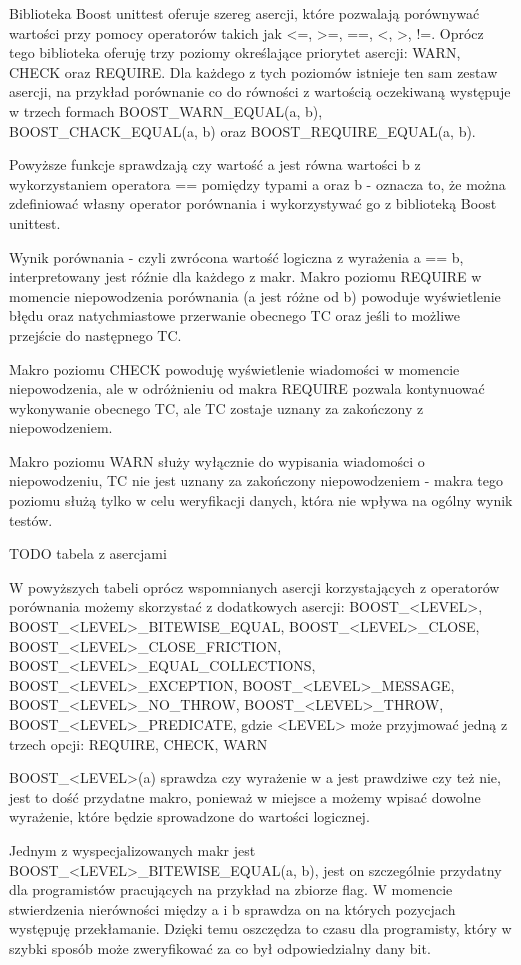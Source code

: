 \documentclass[12pt,a4paper,notitlepage]{report}
\begin{document}
Biblioteka Boost unittest oferuje szereg asercji, które pozwalają porównywać wartości przy pomocy operatorów takich jak <=, >=, ==, <, >, !=. Oprócz tego biblioteka oferuję trzy poziomy określające priorytet asercji: WARN, CHECK oraz REQUIRE. Dla każdego z tych poziomów istnieje ten sam zestaw asercji, na przykład porównanie co do równości z wartością oczekiwaną występuje w trzech formach BOOST{\_}WARN{\_}EQUAL(a, b), BOOST{\_}CHACK{\_}EQUAL(a, b) oraz BOOST{\_}REQUIRE{\_}EQUAL(a, b).

Powyższe funkcje sprawdzają czy wartość a jest równa wartości b z wykorzystaniem operatora == pomiędzy typami a oraz b - oznacza to, że można zdefiniować własny operator porównania i wykorzystywać go z biblioteką Boost unittest. 

Wynik porównania - czyli zwrócona wartość logiczna z wyrażenia a == b, interpretowany jest róźnie dla każdego z makr. Makro poziomu REQUIRE w momencie niepowodzenia porównania (a jest różne od b) powoduje wyświetlenie błędu oraz natychmiastowe przerwanie obecnego TC oraz jeśli to możliwe przejście do następnego TC.

Makro poziomu CHECK powoduję wyświetlenie wiadomości w momencie niepowodzenia, ale w odróżnieniu od makra REQUIRE pozwala kontynuować wykonywanie obecnego TC, ale TC zostaje uznany za zakończony z niepowodzeniem.

Makro poziomu WARN służy wyłącznie do wypisania wiadomości o niepowodzeniu, TC nie jest uznany za zakończony niepowodzeniem - makra tego poziomu służą tylko w celu weryfikacji danych, która nie wpływa na ogólny wynik testów.

TODO tabela z asercjami

W powyższych tabeli oprócz wspomnianych asercji korzystających z operatorów porównania możemy skorzystać z dodatkowych asercji: BOOST{\_}<LEVEL>, BOOST{\_}<LEVEL>{\_}BITEWISE{\_}EQUAL, BOOST{\_}<LEVEL>{\_}CLOSE, BOOST{\_}<LEVEL>{\_}CLOSE{\_}FRICTION, BOOST{\_}<LEVEL>{\_}EQUAL{\_}COLLECTIONS, BOOST{\_}<LEVEL>{\_}EXCEPTION, BOOST{\_}<LEVEL>{\_}MESSAGE, BOOST{\_}<LEVEL>{\_}NO{\_}THROW, BOOST{\_}<LEVEL>{\_}THROW, BOOST{\_}<LEVEL>{\_}PREDICATE, gdzie <LEVEL> może przyjmować jedną z trzech opcji: REQUIRE, CHECK, WARN

BOOST{\_}<LEVEL>(a) sprawdza czy wyrażenie w a jest prawdziwe czy też nie, jest to dość przydatne makro, ponieważ w miejsce a możemy wpisać dowolne wyrażenie, które będzie sprowadzone do wartości logicznej.

Jednym z wyspecjalizowanych makr jest BOOST{\_}<LEVEL>{\_}BITEWISE{\_}EQUAL(a, b), jest on szczególnie przydatny dla programistów pracujących na przykład na zbiorze flag. W momencie stwierdzenia nierówności między a i b sprawdza on na których pozycjach występuję przekłamanie. Dzięki temu oszczędza to czasu dla programisty, który w szybki sposób może zweryfikować za co był odpowiedzialny dany bit.
\end{document}
